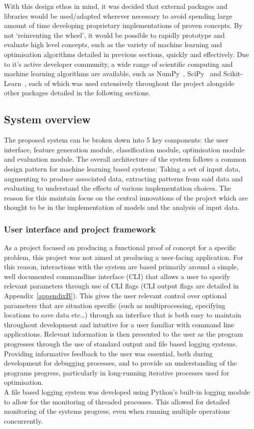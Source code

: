 \documentclass[titlepage, 12pt]{scrartcl} \usepackage{enumitem}
\begin{document}
With this design ethos in mind, it was decided that external packages and
libraries would be used/adapted wherever necessary to avoid spending large
amount of time developing proprietary implementations of proven concepts. By
not `reinventing the wheel', it would be possible to rapidly prototype and
evaluate high level concepts, such as the variety of machine learning and
optimisation algorithms detailed in previous sections, quickly and effectively.
Due to it's active developer community, a wide range of scientific computing
and machine learning algorithms are available, such as
NumPy~\parencite{VanDerWalt2011}, SciPy~\parencite{Millman2011} and
Scikit-Learn~\parencite{Pedregosa2011}, each of which was used extensively
throughout the project alongside other packages detailed in the following
sections.

\subsection{System overview}
The proposed system can be broken down into 5 key components: the user
interface, feature generation module, classification module, optimisation
module and evaluation module. The overall architecture of the system follows a
common design pattern for machine learning based systems; Taking a set of input
data, augmenting to produce associated data, extracting patterns from said
data and evaluating to understand the effects of various implementation
choices. The reason for this maintain focus on the central innovations of the
project which are thought to be in the implementation of models and the
analysis of input data.

\subsubsection{User interface and project framework}
As a project focused on producing a functional proof of concept for a specific
problem, this project was not aimed at producing a user-facing application. For
this reason, interactions with the system are based primarily around a simple,
well documented commandline interface (CLI) that allows a user to specify
relevant parameters through use of CLI flags (CLI output flags are detailed in
Appendix~\ref{appendixB}). This gives the user relevant
control over optional parameters that are situation specific (such as
multiprocessing, specifying locations to save data etc\ldots) through an interface that is both easy to maintain throughout
development and intuitive for a user familiar with command line applications.
Relevant information is then presented to the user as the program progresses
through the use of standard output and file based logging systems. Providing
informative feedback to the user was essential, both during development for
debugging processes, and to provide an understanding of the programs progress,
particularly in long-running iterative processes used for optimisation.\\
A file based logging system was developed using Python's built-in logging
module to allow for the monitoring of threaded processes. This allowed for
detailed monitoring of the systems progress, even when running multiple
operations concurrently.\\
\end{document}
